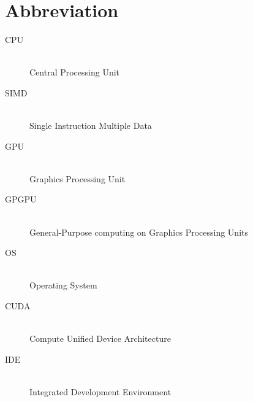 \documentclass[oneside, a4paper]{article}
\begin{document}
    \section{Abbreviation}

    \begin{description}
        \item[CPU] \hfill \\
            Central Processing Unit
        \item[SIMD] \hfill \\
            Single Instruction Multiple Data
        \item[GPU] \hfill \\
            Graphics Processing Unit
        \item[GPGPU] \hfill \\
            General-Purpose computing on Graphics Processing Units
        \item[OS] \hfill \\
            Operating System
        \item[CUDA] \hfill \\
            Compute Unified Device Architecture
        \item[IDE] \hfill \\
            Integrated Development Environment
    \end{description}

    
    
\end{document}
